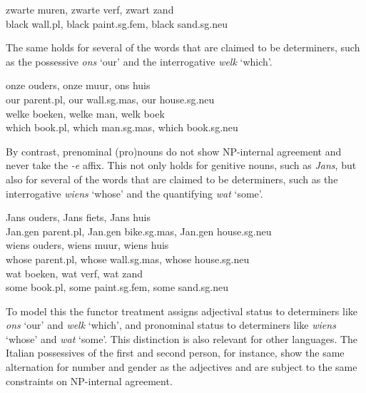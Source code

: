 \documentclass[output=paper]{langsci/langscibook}
\begin{document}
\begin{exe} 
\ex\label{wit} 
\gll  zwarte muren,        zwarte verf,              zwart zand \\
      black wall.{\sc pl}, black paint.{\sc sg.fem}, black sand.{\sc sg.neu} \\
\end{exe} 

\noindent
The same holds for several of the words that are claimed to be determiners, 
such as the possessive \emph{ons} `our' and the interrogative \emph{welk} `which'. 

\begin{exe} 
\ex\label{ons}
\gll onze ouders,         onze muur,             ons huis     \\
     our parent.{\sc pl}, our wall.{\sc sg.mas}, our house.{\sc sg.neu} \\
\ex\label{welk} 
\gll welke boeken,        welke man,              welk boek   \\
     which book.{\sc pl}, which man.{\sc sg.mas}, which book.{\sc sg.neu} \\
\end{exe} 

\noindent
By contrast, prenominal (pro)nouns do not show NP-internal agreement and  
never take the \emph{-e} affix. This not only holds for genitive nouns, 
such as \emph{Jans}, but also for several of the words that are claimed 
to be determiners, such as the interrogative \emph{wiens} `whose' 
and the quantifying \emph{wat} `some'. 

\begin{exe} 
\ex\label{jans}
\gll  Jans ouders,                   Jans fiets,                      Jans huis \\ 
      Jan.{\sc gen} parent.{\sc pl}, Jan.{\sc gen} bike.{\sc sg.mas}, Jan.{\sc gen} house.{\sc sg.neu} \\
\ex\label{wiens}
\gll  wiens ouders,          wiens muur,              wiens huis \\ 
      whose parent.{\sc pl}, whose wall.{\sc sg.mas}, whose house.{\sc sg.neu} \\
\ex\label{wat}
\gll  wat boeken,         wat verf,                wat zand  \\
      some book.{\sc pl}, some paint.{\sc sg.fem}, some sand.{\sc sg.neu} \\
\end{exe} 

\noindent
To model this the functor treatment assigns adjectival status 
to determiners like \emph{ons} `our' and \emph{welk} `which', 
and pronominal status to determiners like \emph{wiens} `whose' and
\emph{wat} `some'.  
This distinction is also relevant for other languages. The Italian 
possessives of the first and second person, for instance, 
show the same alternation for number and gender as the adjectives
and are subject to the same constraints on NP-internal agreement.
\end{document}
